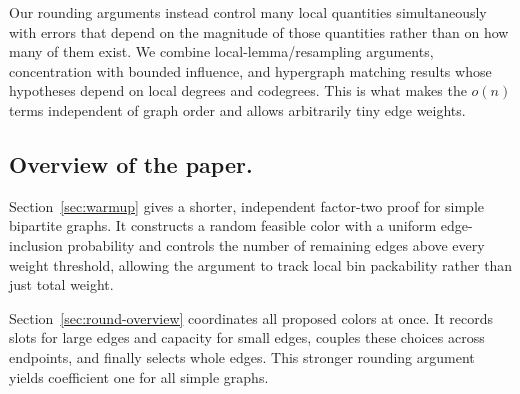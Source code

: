 \documentclass[11pt]{article}
\theoremstyle{definition}\newtheorem{algorithm}{Algorithm}[section]
\numberwithin{equation}{section}
\theoremstyle{remark}\newtheorem*{remark}{Remark}
\newcommand{\bp}{\operatorname{bp}}
\begin{document}
Our rounding arguments instead control many local quantities simultaneously with errors that depend on the magnitude of those quantities rather than on how many of them exist.  We combine local-lemma/resampling arguments, concentration with bounded influence, and hypergraph matching results whose hypotheses depend on local degrees and codegrees.  This is what makes the $o(n)$ terms independent of graph order and allows arbitrarily tiny edge weights.











\subsection*{Overview of the paper.}
Section~\ref{sec:warmup} gives a shorter, independent factor-two proof
for simple bipartite graphs. It constructs a random feasible color with
a uniform edge-inclusion probability and controls the number of remaining
edges above every weight threshold, allowing the argument to track local
bin packability rather than just total weight.


Section~\ref{sec:round-overview} coordinates all proposed colors at once.
It records slots for large edges and capacity for small edges, couples
these choices across endpoints, and finally selects whole edges. This
stronger rounding argument yields coefficient one for all simple graphs.
\end{document}
